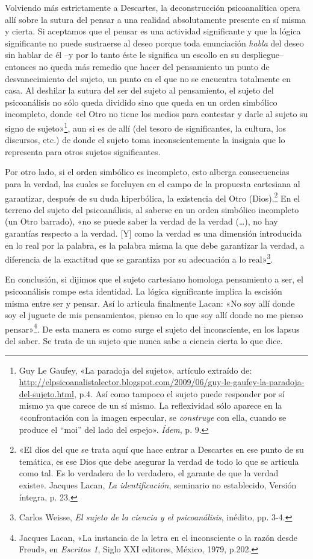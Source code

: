 Volviendo más estrictamente a Descartes, la deconstrucción psicoanalítica opera allí sobre la sutura del pensar a una realidad absolutamente presente en sí misma y cierta. Si aceptamos que el pensar es una actividad significante y que la lógica significante no puede sustraerse al deseo porque toda enunciación \emph{habla} del deseo sin hablar de él --y por lo tanto éste le significa un escollo en su despliegue-- entonces no queda más remedio que hacer del pensamiento un punto de desvanecimiento del sujeto, un punto en el que no se encuentra totalmente en casa. Al deshilar la sutura del ser del sujeto al pensamiento, el sujeto del psicoanálisis no sólo queda dividido sino que queda en un orden simbólico incompleto, donde «el Otro no tiene los medios para contestar y darle al sujeto su signo de sujeto»\footnote{Guy Le Gaufey, «La paradoja del sujeto», artículo extraído de: \url{http://elpsicoanalistalector.blogspot.com/2009/06/guy-le-gaufey-la-paradoja-del-sujeto.html}, p.4. Así como tampoco el sujeto puede responder por sí mismo ya que carece de un sí mismo. La reflexividad sólo aparece en la «confrontación con la imagen especular, se \emph{construye} con ella, cuando se produce el ``moi'' del lado del espejo». \emph{Ídem}, p. 9.}, aun si es de allí (del tesoro de significantes, la cultura, los discursos, etc.) de donde el sujeto toma inconscientemente la insignia que lo representa para otros sujetos significantes.

Por otro lado, si el orden simbólico es incompleto, esto alberga consecuencias para la verdad, las cuales se forcluyen en el campo de la propuesta cartesiana al garantizar, después de su duda hiperbólica, la existencia del Otro (Dios).\footnote{«El dios del que se trata aquí que hace entrar a Descartes en ese punto de su temática, es ese Dios que debe asegurar la verdad de todo lo que se articula como tal. Es lo verdadero de lo verdadero, el garante de que la verdad existe». Jacques Lacan, \emph{La identificación}, seminario no establecido, Versión íntegra, p. 23.} En el terreno del sujeto del psicoanálisis, al saberse en un orden simbólico incompleto (un Otro barrado), «no se puede saber la verdad de la verdad (\ldots), no hay garantías respecto a la verdad. {[}Y{]} como la verdad es una dimensión introducida en lo real por la palabra, es la palabra misma la que debe garantizar la verdad, a diferencia de la exactitud que se garantiza por su adecuación a lo real»\footnote{Carlos Weisse, \emph{El sujeto de la ciencia y el psicoanálisis}, inédito, pp. 3-4.}.

En conclusión, si dijimos que el sujeto cartesiano homologa pensamiento a ser, el psicoanálisis rompe esta identidad. La lógica significante implica la escisión misma entre ser y pensar. Así lo articula finalmente Lacan: «No soy allí donde soy el juguete de mis pensamientos, pienso en lo que soy allí donde no me pienso pensar»\footnote{Jacques Lacan, «La instancia de la letra en el inconsciente o la razón desde Freud», en \emph{Escritos 1}, Siglo XXI editores, México, 1979, p.202.}. De esta manera es como surge el sujeto del inconsciente, en los lapsus del saber. Se trata de un sujeto que nunca sabe a ciencia cierta lo que dice.

